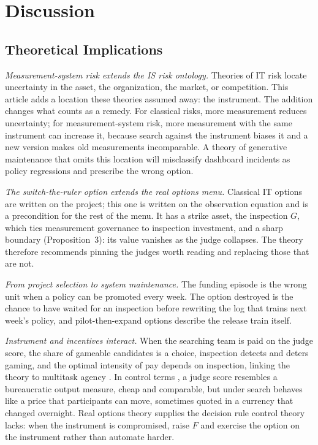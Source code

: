\documentclass[acmsmall,screen,review,anonymous]{acmart}
\theoremstyle{acmdefinition}
\begin{document}
\section{Discussion}\label{sec:discussion}

\subsection{Theoretical Implications}

\emph{Measurement-system risk extends the IS risk ontology.} Theories of IT risk locate uncertainty in the asset, the organization, the market, or competition. This article adds a location these theories assumed away: the instrument. The addition changes what counts as a remedy. For classical risks, more measurement reduces uncertainty; for measurement-system risk, more measurement with the same instrument can increase it, because search against the instrument biases it and a new version makes old measurements incomparable. A theory of generative maintenance that omits this location will misclassify dashboard incidents as policy regressions and prescribe the wrong option.

\emph{The switch-the-ruler option extends the real options menu.} Classical IT options are written on the project; this one is written on the observation equation and is a precondition for the rest of the menu. It has a strike asset, the inspection $G$, which ties measurement governance to inspection investment, and a sharp boundary (Proposition~3): its value vanishes as the judge collapses. The theory therefore recommends pinning the judges worth reading and replacing those that are not.

\emph{From project selection to system maintenance.} The funding episode is the wrong unit when a policy can be promoted every week. The option destroyed is the chance to have waited for an inspection before rewriting the log that trains next week's policy, and pilot-then-expand options describe the release train itself.

\emph{Instrument and incentives interact.} When the searching team is paid on the judge score, the share of gameable candidates is a choice, inspection detects and deters gaming, and the optimal intensity of pay depends on inspection, linking the theory to multitask agency \citep{holmstrom1991}. In control terms \citep{ouchi1979}, a judge score resembles a bureaucratic output measure, cheap and comparable, but under search behaves like a price that participants can move, sometimes quoted in a currency that changed overnight. Real options theory supplies the decision rule control theory lacks: when the instrument is compromised, raise $F$ and exercise the option on the instrument rather than automate harder.
\end{document}
